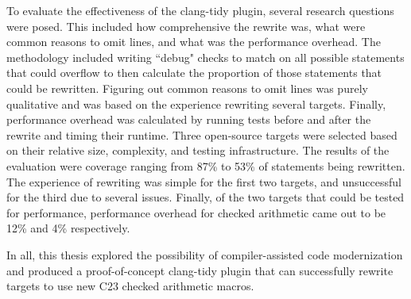 To evaluate the effectiveness of the clang-tidy plugin, several research questions were posed. This included how comprehensive the rewrite was, what were common reasons to omit lines, and what was the performance overhead. The methodology included writing ``debug" checks to match on all possible statements that could overflow to then calculate the proportion of those statements that could be rewritten. Figuring out common reasons to omit lines was purely qualitative and was based on the experience rewriting several targets. Finally, performance overhead was calculated by running tests before and after the rewrite and timing their runtime. Three open-source targets were selected based on their relative size, complexity, and testing infrastructure. The results of the evaluation were coverage ranging from 87\% to 53\% of statements being rewritten. The experience of rewriting was simple for the first two targets, and unsuccessful for the third due to several issues. Finally, of the two targets that could be tested for performance, performance overhead for checked arithmetic came out to be 12\% and 4\% respectively.

In all, this thesis explored the possibility of compiler-assisted code modernization and produced a proof-of-concept clang-tidy plugin that can successfully rewrite targets to use new C23 checked arithmetic macros.
